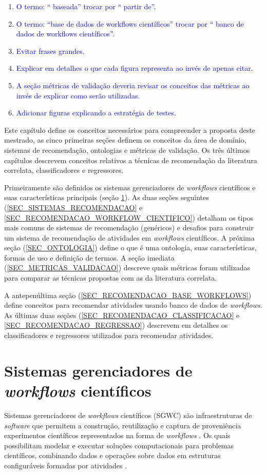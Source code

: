 \begin{enumerate}
\item \textcolor{blue}{O termo: `` baseada'' trocar por `` partir de''.}
\item \textcolor{blue}{O termo: ``base de dados de workflows científicos'' trocar por `` banco de dados de workflows científicos''.}
\item \textcolor{blue}{Evitar frases grandes.}
\item \textcolor{blue}{Explicar em detalhes o que cada figura representa ao invés de apenas citar.}
\item \textcolor{blue}{A seção métricas de validação deveria revisar os conceitos das métricas ao invés de explicar como serão utilizadas.}
\item \textcolor{blue}{Adicionar figuras explicando a estratégia de testes.}
\end{enumerate}

\newpage


Este capítulo define os conceitos necessários para compreender a proposta deste mestrado, as cinco primeiras seções definem os conceitos da área de domínio, sistemas de recomendação, ontologias e métricas de validação. Os três últimos capítulos descrevem conceitos relativos a técnicas de recomendação da literatura correlata, classificadores e regressores.

Primeiramente são definidos os sistemas gerenciadores de \emph{workf\mbox{}lows} científ\mbox{}icos e suas características principais (seção \ref{SEC_SISTEMA_GERENCIADOR_WORKFLOW}). As duas seções seguintes (\ref{SEC_SISTEMAS_RECOMENDACAO} e \ref{SEC_RECOMENDACAO_WORKFLOW_CIENTIFICO}) detalham os tipos mais comuns de sistemas de recomendação (genéricos) e desafios para construir um sistema de recomendação de atividades em \emph{workf\mbox{}lows} científ\mbox{}icos. A próxima seção (\ref{SEC_ONTOLOGIA}) define o que é uma ontologia, suas características, formas de uso e definição de termos. A seção imediata (\ref{SEC_METRICAS_VALIDACAO}) descreve quais métricas foram utilizadas para comparar as técnicas propostas com as da literatura correlata. 

A antepenúltima seção (\ref{SEC_RECOMENDACAO_BASE_WORKFLOWS}) define conceitos para recomendar atividades usando banco de dados de \emph{workf\mbox{}lows}. As últimas duas seções (\ref{SEC_RECOMENDACAO_CLASSIFICACAO} e \ref{SEC_RECOMENDACAO_REGRESSAO}) descrevem em detalhes os classificadores e regressores utilizados para recomendar atividades.


\section{Sistemas gerenciadores de \emph{workf\mbox{}lows} científ\mbox{}icos}\label{SEC_SISTEMA_GERENCIADOR_WORKFLOW}
Sistemas gerenciadores de \emph{workflows} científicos (SGWC) são infraestruturas de \emph{software} que permitem a construção, reutilização e captura de proveniência experimentos científicos representados na forma de \emph{workflows} \cite{McPhillips2009}. Os quais possibilitam modelar e executar soluções computacionais para problemas científicos, combinando dados e operações sobre dados em estruturas configuráveis formadas por atividades \cite{Garijo2014}.

